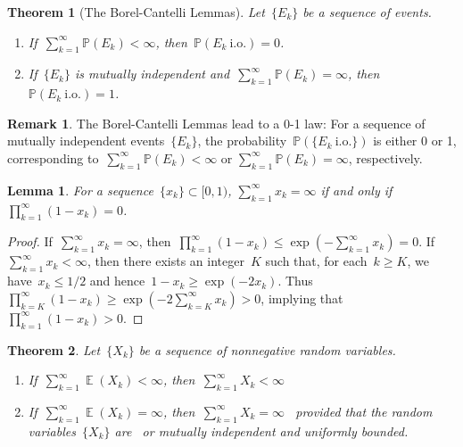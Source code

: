 \documentclass[12pt,a4paper]{article}  %
\newtheorem{theorem}{Theorem}[section]
\newtheorem{lemma}{Lemma}[section]
\theoremstyle{definition}
\newtheorem{remark}{Remark}[section]
\numberwithin{equation}{section}
\newcommand{\io}{{\text{i.o.}}\xspace}
\newcommand{\as}{{\text{a.s.}}\xspace}
\newcommand{\iid}{{\text{i.i.d.}}\xspace}
\DeclareMathOperator{\expc}{\mathbb{E}}
\renewcommand{\Pr}{\mathbb{P}}
\begin{document}
\begin{theorem}[The Borel-Cantelli Lemmas]
    \label{th:bc}
    Let~$\{E_k\}$ be a sequence of events.
    \begin{enumerate}
        \item If~$\sum_{k=1}^\infty \Pr(E_k) < \infty$, then~$\Pr(E_k~\io) = 0$.
        \item If~$\{E_k\}$ is mutually independent and~$\sum_{k=1}^\infty \Pr(E_k)
            = \infty$, then~$\Pr(E_k~\io) = 1$.
    \end{enumerate}
\end{theorem}

\begin{remark}
    \label{rem:01}
    The Borel-Cantelli Lemmas lead to a 0-1 law: For a sequence of mutually independent
    events~$\{E_k\}$, the probability~$\Pr(\{E_k~\io\})$ is either 0 or 1, corresponding
    to~$\sum_{k=1}^\infty \Pr(E_k) < \infty$ or $\sum_{k=1}^\infty \Pr(E_k) = \infty$, respectively.
\end{remark}

\begin{lemma}
    \label{lem:sumprod}
    For a sequence~$\{x_k\} \subset [0,1)$, $\sum_{k=1}^\infty x_k = \infty$ if and only if
     $\prod_{k=1}^\infty (1-x_k) = 0$.
\end{lemma}
\begin{proof}
    If~$\sum_{k=1}^\infty x_k = \infty$, then~$\prod_{k=1}^\infty (1-x_k)\le \exp(-\sum_{k=1}^\infty
    x_k) = 0$. If~$\sum_{k=1}^\infty x_k < \infty$, then there exists an integer~$K$ such
    that, for each~$k\ge K$, we have~$x_k \le 1/2$ and hence~$1-x_k \ge \exp(-2x_k)$. Thus
    $\prod_{k=K}^\infty (1-x_k) \ge \exp(-2\sum_{k=K}^\infty x_k) > 0$, implying that~$\prod_{k=1}^\infty
    (1-x_k) > 0$.
\end{proof}

\begin{theorem}
    \label{th:inf}
    Let~$\{X_k\}$ be a sequence of nonnegative random variables.
    \begin{enumerate}
        \item If~$\sum_{k=1}^\infty\expc(X_k) < \infty$, then~$\sum_{k=1}^\infty X_k < \infty$~\as
        \item If~$\sum_{k=1}^\infty\expc(X_k)= \infty$, then~$\sum_{k=1}^\infty X_k = \infty$~\as
            provided that the random variables~$\{X_k\}$ are~\iid or mutually independent and
            uniformly bounded.
    \end{enumerate}
\end{theorem}
\end{document}
